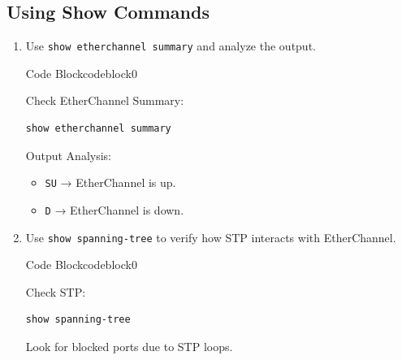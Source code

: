 \documentclass[a4paper]{article}
\begin{document}
\subsection{Using Show Commands}
\begin{enumerate}
	\item Use \texttt{show etherchannel summary} and analyze the output.


	      \begin{ocg}{Code Block}{codeblock}{0}

		      \vspace{0.5cm}

		      Check EtherChannel Summary:
		      \begin{lstlisting}
show etherchannel summary
    \end{lstlisting}

		      Output Analysis:
		      \begin{tcolorbox}
			      \begin{itemize}
				      \item \texttt{SU} → EtherChannel is up.
				      \item \texttt{D} → EtherChannel is down.
			      \end{itemize}
		      \end{tcolorbox}


		      \vspace{0.5cm}
	      \end{ocg}
	\item Use \texttt{show spanning-tree} to verify how STP interacts with EtherChannel.


	      \begin{ocg}{Code Block}{codeblock}{0}

		      \vspace{0.5cm}

		      Check STP:
		      \begin{lstlisting}
show spanning-tree
        \end{lstlisting}


		      \begin{tcolorbox}
			      Look for blocked ports due to STP loops.
		      \end{tcolorbox}



\end{ocg}
\end{enumerate}
\end{document}
